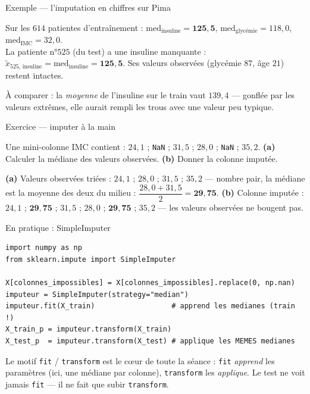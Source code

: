\documentclass[aspectratio=169,11pt]{beamer}
\begin{document}
\begin{frame}{Exemple — l'imputation en chiffres sur Pima}
\begin{ucadex}
{\small Sur les $614$ patientes d'entraînement : $\text{med}_{\text{insuline}} = \mathbf{125{,}5}$, $\text{med}_{\text{glycémie}} = 118{,}0$, $\text{med}_{\text{IMC}} = 32{,}0$.\\[3pt]
La patiente n°$525$ (du test) a une insuline manquante : $\tilde{x}_{525,\,\text{insuline}} = \text{med}_{\text{insuline}} = \mathbf{125{,}5}$. Ses valeurs observées (glycémie $87$, âge $21$) restent intactes.}
\end{ucadex}
{\small À comparer : la \emph{moyenne} de l'insuline sur le train vaut $139{,}4$ — gonflée par les valeurs extrêmes, elle aurait rempli les trous avec une valeur peu typique.}
\end{frame}

\begin{frame}{Exercice — imputer à la main}
\begin{ucadrec}[Énoncé]
{\small Une mini-colonne IMC contient : $24{,}1$ ; \texttt{NaN} ; $31{,}5$ ; $28{,}0$ ; \texttt{NaN} ; $35{,}2$. \textbf{(a)} Calculer la médiane des valeurs observées. \textbf{(b)} Donner la colonne imputée.}
\end{ucadrec}
\pause
\begin{ucadex}[Correction]
{\small \textbf{(a)} Valeurs observées triées : $24{,}1$ ; $28{,}0$ ; $31{,}5$ ; $35{,}2$ — nombre pair, la médiane est la moyenne des deux du milieu : $\dfrac{28{,}0 + 31{,}5}{2} = \mathbf{29{,}75}$. \textbf{(b)} Colonne imputée : $24{,}1$ ; $\mathbf{29{,}75}$ ; $31{,}5$ ; $28{,}0$ ; $\mathbf{29{,}75}$ ; $35{,}2$ — les valeurs observées ne bougent pas.}
\end{ucadex}
\end{frame}

\begin{frame}[fragile]{En pratique : SimpleImputer}
\begin{lstlisting}
import numpy as np
from sklearn.impute import SimpleImputer

X[colonnes_impossibles] = X[colonnes_impossibles].replace(0, np.nan)
imputeur = SimpleImputer(strategy="median")
imputeur.fit(X_train)                  # apprend les medianes (train !)
X_train_p = imputeur.transform(X_train)
X_test_p  = imputeur.transform(X_test) # applique les MEMES medianes
\end{lstlisting}
{\small Le motif \texttt{fit} / \texttt{transform} est le cœur de toute la séance : \texttt{fit} \emph{apprend} les paramètres (ici, une médiane par colonne), \texttt{transform} les \emph{applique}. Le test ne voit jamais \texttt{fit} — il ne fait que subir \texttt{transform}.}
\end{frame}
\end{document}
